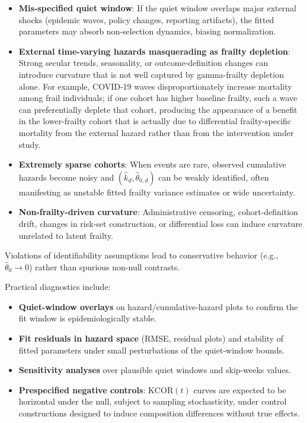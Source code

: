 \documentclass[
]{article}
\providecommand{\tightlist}{%
  \setlength{\itemsep}{0pt}\setlength{\parskip}{0pt}}
\begin{document}
\begin{itemize}
\tightlist
\item
  \textbf{Mis-specified quiet window}: If the quiet window overlaps
  major external shocks (epidemic waves, policy changes, reporting
  artifacts), the fitted parameters may absorb non-selection dynamics,
  biasing normalization.
\item
  \textbf{External time-varying hazards masquerading as frailty
  depletion}: Strong secular trends, seasonality, or outcome-definition
  changes can introduce curvature that is not well captured by
  gamma-frailty depletion alone. For example, COVID-19 waves
  disproportionately increase mortality among frail individuals; if one
  cohort has higher baseline frailty, such a wave can preferentially
  deplete that cohort, producing the appearance of a benefit in the
  lower-frailty cohort that is actually due to differential
  frailty-specific mortality from the external hazard rather than from
  the intervention under study.
\item
  \textbf{Extremely sparse cohorts}: When events are rare, observed
  cumulative hazards become noisy and \((\hat{k}_d,\hat{\theta}_{0,d})\)
  can be weakly identified, often manifesting as unstable fitted frailty
  variance estimates or wide uncertainty.
\item
  \textbf{Non-frailty-driven curvature}: Administrative censoring,
  cohort-definition drift, changes in risk-set construction, or
  differential loss can induce curvature unrelated to latent frailty.
\end{itemize}

Violations of identifiability assumptions lead to conservative behavior
(e.g., \(\hat{\theta}_0 \to 0\)) rather than spurious non-null
contrasts.

Practical diagnostics include:

\begin{itemize}
\tightlist
\item
  \textbf{Quiet-window overlays} on hazard/cumulative-hazard plots to
  confirm the fit window is epidemiologically stable.
\item
  \textbf{Fit residuals in hazard space} (RMSE, residual plots) and
  stability of fitted parameters under small perturbations of the
  quiet-window bounds.
\item
  \textbf{Sensitivity analyses} over plausible quiet windows and
  skip-weeks values.
\item
  \textbf{Prespecified negative controls}: \(\mathrm{KCOR}(t)\) curves
  are expected to be horizontal under the null, subject to sampling
  stochasticity, under control constructions designed to induce
  composition differences without true effects.
\end{itemize}
\end{document}
